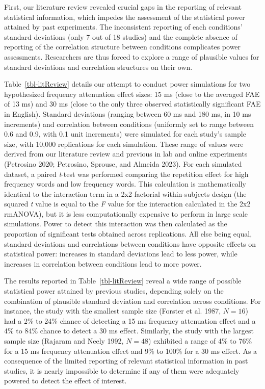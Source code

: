 \documentclass[
]{interact}
\begin{document}
First, our literature review revealed crucial gaps in the reporting of
relevant statistical information, which impedes the assessment of the
statistical power attained by past experiments. The inconsistent
reporting of each conditions' standard deviations (only 7 out of 18
studies) and the complete absence of reporting of the correlation
structure between conditions complicates power assessments. Researchers
are thus forced to explore a range of plausible values for standard
deviations and correlation structures on their own.

Table~\ref{tbl-litReview} details our attempt to conduct power
simulations for two hypothesized frequency attenuation effect sizes: 15
ms (close to the averaged FAE of 13 ms) and 30 ms (close to the only
three observed statistically significant FAE in English). Standard
deviations (ranging between 60 ms and 180 ms, in 10 ms increments) and
correlation between conditions (uniformly set to range between 0.6 and
0.9, with 0.1 unit increments) were simulated for each study's sample
size, with 10,000 replications for each simulation. These range of
values were derived from our literature review and previous in lab and
online experiments (Petrosino 2020; Petrosino, Sprouse, and Almeida
2023). For each simulated dataset, a paired \emph{t}-test was performed
comparing the repetition effect for high frequency words and low
frequency words. This calculation is mathematically identical to the
interaction term in a 2x2 factorial within-subjects design (the squared
\emph{t} value is equal to the \emph{F} value for the interaction
calculated in the 2x2 rmANOVA), but it is less computationally expensive
to perform in large scale simulations. Power to detect this interaction
was then calculated as the proportion of significant tests obtained
across replications. All else being equal, standard deviations and
correlations between conditions have opposite effects on statistical
power: increases in standard deviations lead to less power, while
increases in correlation between conditions lead to more power.

The results reported in Table~\ref{tbl-litReview} reveal a wide range of
possible statistical power attained by previous studies, depending
solely on the combination of plausible standard deviation and
correlation across conditions. For instance, the study with the smallest
sample size (Forster et al. 1987, \(N=16\)) had a 2\% to 24\% chance of
detecting a 15 ms frequency attenuation effect and a 4\% to 84\% chance
to detect a 30 ms effect. Similarly, the study with the largest sample
size (Rajaram and Neely 1992, \(N=48\)) exhibited a range of 4\% to 76\%
for a 15 ms frequency attenuation effect and 9\% to 100\% for a 30 ms
effect. As a consequence of the limited reporting of relevant
statistical information in past studies, it is nearly impossible to
determine if any of them were adequately powered to detect the effect of
interest.
\end{document}
